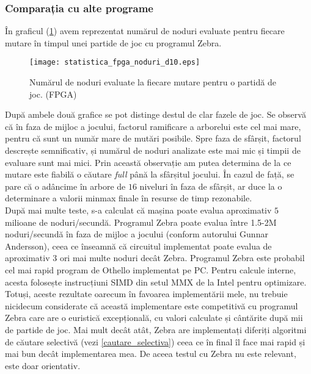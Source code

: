 \documentclass[12pt,twoside,a4paper,fleqn]{book}
\theoremstyle{definition}
\begin{document}
\subsubsection{Comparația cu alte programe}
În graficul (\ref{fig:statistics_01}) avem reprezentat numărul de noduri evaluate pentru fiecare mutare în timpul unei partide de joc cu programul Zebra. \\

\begin{figure}[h]
\begin{center}
\texttt{[image: statistica\_fpga\_noduri\_d10.eps]}
\end{center}
\caption{\small{Numărul de noduri evaluate la fiecare mutare pentru o partidă de joc. (FPGA)}}
\label{fig:statistics_01}
\end{figure}

După ambele două grafice se pot distinge destul de clar fazele de joc. Se observă că în faza de mijloc a jocului, factorul ramificare a arborelui este cel mai mare, pentru că sunt un număr mare de mutări posibile. Spre faza de sfârșit, factorul descrește semnificativ, și numărul de noduri analizate este mai mic și timpii de evaluare sunt mai mici. Prin această observație am putea determina de la ce mutare este fiabilă o căutare \emph{full} până la sfârșitul jocului. În cazul de față, se pare că o adâncime în arbore de $16$ niveluri în faza de sfârșit, ar duce la o determinare a valorii minmax finale în resurse de timp rezonabile.\\
După mai multe teste, s-a calculat că mașina poate evalua aproximativ $5$ milioane de noduri/secundă. Programul Zebra poate evalua între 1.5-2M noduri/secundă în faza de mijloc a jocului (conform autorului Gunnar Andersson), ceea ce înseamnă că circuitul implementat poate evalua de aproximativ $3$ ori mai multe noduri decât Zebra. Programul Zebra este probabil cel mai rapid program de Othello implementat pe PC. Pentru calcule interne, acesta folosește instrucțiuni SIMD din setul MMX de la Intel pentru optimizare. Totuși, aceste rezultate oarecum în favoarea implementării mele, nu trebuie nicidecum considerate că această implementare este competitivă cu programul Zebra care are o euristică excepțională, cu valori calculate și cântărite după mii de partide de joc. Mai mult decât atât, Zebra are implementați diferiți algoritmi de căutare selectivă (vezi \ref{cautare_selectiva}) ceea ce în final îl face mai rapid și mai bun decât implementarea mea. De aceea testul cu Zebra nu este relevant, este doar orientativ.
\end{document}
